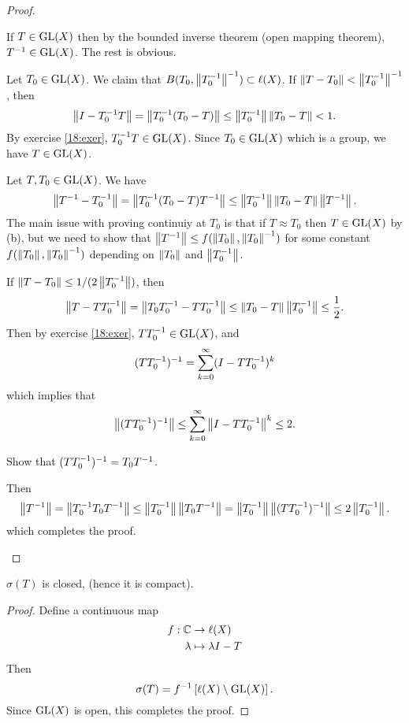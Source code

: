 \begin{proof}
  \leavevmode
  \begin{enum}
    \io
    If $T \in \operatorname{GL}(X)$ then by the bounded inverse theorem (open mapping theorem), $T^{-1} \in \operatorname{GL}(X)$.
    The rest is obvious.

    \io
    Let $T_0 \in \operatorname{GL}(X)$.
    We claim that $B(T_0, \left\lVert T_0^{-1} \right\rVert^{-1}) \subset \ell(X)$.
    If $\left\lVert T-T_0 \right\rVert<\left\lVert T_0^{-1} \right\rVert^{-1}$, then
    \[ \left\lVert I-T_0^{-1} T \right\rVert = \left\lVert T_0^{-1} (T_0-T) \right\rVert \leq \left\lVert T_0^{-1} \right\rVert\left\lVert T_0-T \right\rVert < 1. \]
    By exercise \ref{18:exer}, $T_0^{-1} T \in \operatorname{GL}(X)$.
    Since $T_0 \in \operatorname{GL}(X)$ which is a group, we have $T \in \operatorname{GL}(X)$.

    \io
    Let $T,T_0 \in \operatorname{GL}(X)$.
    We have
    \[ \left\lVert T^{-1}-T_0^{-1} \right\rVert = \left\lVert T_0^{-1}(T_0-T)T^{-1} \right\rVert \leq \left\lVert T_0^{-1} \right\rVert\left\lVert T_0-T \right\rVert\left\lVert T^{-1} \right\rVert. \]
    The main issue with proving continuiy at $T_0$ is that if $T \approx T_0$ then $T \in \operatorname{GL}(X)$ by (b), but we need to show that $\left\lVert T^{-1} \right\rVert \leq f(\left\lVert T_0 \right\rVert,\left\lVert T_0 \right\rVert^{-1})$ for some constant $f(\left\lVert T_0 \right\rVert,\left\lVert T_0 \right\rVert^{-1})$ depending on $\left\lVert T_0 \right\rVert$ and $\left\lVert T_0^{-1} \right\rVert$.

    If $\left\lVert T-T_0 \right\rVert \leq 1/(2\left\lVert T_0^{-1} \right\rVert)$, then
    \[ \left\lVert T-TT_0^{-1} \right\rVert = \left\lVert T_0T_0^{-1}-TT_0^{-1} \right\rVert \leq \left\lVert T_0-T \right\rVert\left\lVert T_0^{-1} \right\rVert \leq \frac 12. \]
    Then by exercise \ref{18:exer}, $TT_0^{-1} \in \operatorname{GL}(X)$, and
    \[ (TT_0^{-1})^{-1} = \sum_{k=0}^\infty (I-TT_0^{-1})^k \]
    which implies that
    \[ \left\lVert (TT_0^{-1})^{-1} \right\rVert \leq \sum_{k=0}^\infty \left\lVert I-TT_0^{-1} \right\rVert^k \leq 2. \]

  \begin{exer}
    Show that $(TT_0^{-1})^{-1} = T_0T^{-1}$.
  \end{exer}

  Then
  \[ \left\lVert T^{-1} \right\rVert = \left\lVert T_0^{-1} T_0 T^{-1} \right\rVert \leq \left\lVert T_0^{-1} \right\rVert\left\lVert T_0T^{-1} \right\rVert = \left\lVert T_0^{-1} \right\rVert \left\lVert (TT_0^{-1})^{-1} \right\rVert \leq 2\left\lVert T_0^{-1} \right\rVert. \]
  which completes the proof.
  \end{enum}
\end{proof}

\begin{cor}
  $\sigma(T)$ is closed, (hence it is compact).
\end{cor}

\begin{proof}
  Define a continuous map
  \begin{align*}
    f: \mathbb{C} &\to \ell(X) \\
    \lambda &\mapsto \lambda I-T
  \end{align*}
  Then
  \[ \sigma(T) = f^{-1}\left[ \ell(X) \setminus \operatorname{GL}(X) \right]. \]
  Since $\operatorname{GL}(X)$ is open, this completes the proof.
\end{proof}
